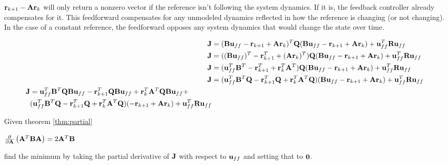 \begin{remark}
  $\mathbf{r}_{k+1} - \mathbf{A}\mathbf{r}_k$ will only return a nonzero vector if the
  reference isn't following the system dynamics. If it is, the feedback
  controller already compensates for it. This feedforward compensates for any
  unmodeled dynamics reflected in how the reference is changing (or not
  changing). In the case of a constant reference, the feedforward opposes any
  system dynamics that would change the state over time.
\end{remark}

\begin{align*}
  \mathbf{J} &= (\mathbf{B}\mathbf{u}_{ff} - \mathbf{r}_{k+1} + \mathbf{A}\mathbf{r}_k)^T \mathbf{Q}
    (\mathbf{B}\mathbf{u}_{ff} - \mathbf{r}_{k+1} + \mathbf{A}\mathbf{r}_k) +
    \mathbf{u}_{ff}^T\mathbf{R}\mathbf{u}_{ff} \\
  \mathbf{J} &= ((\mathbf{B}\mathbf{u}_{ff})^T - \mathbf{r}_{k+1}^T + (\mathbf{A}\mathbf{r}_k)^T)
    \mathbf{Q}(\mathbf{B}\mathbf{u}_{ff} - \mathbf{r}_{k+1} + \mathbf{A}\mathbf{r}_k) +
    \mathbf{u}_{ff}^T\mathbf{R}\mathbf{u}_{ff} \\
  \mathbf{J} &= (\mathbf{u}_{ff}^T\mathbf{B}^T - \mathbf{r}_{k+1}^T + \mathbf{r}_k^T\mathbf{A}^T)
    \mathbf{Q}(\mathbf{B}\mathbf{u}_{ff} - \mathbf{r}_{k+1} + \mathbf{A}\mathbf{r}_k) +
    \mathbf{u}_{ff}^T\mathbf{R}\mathbf{u}_{ff} \\
  \mathbf{J} &= (\mathbf{u}_{ff}^T\mathbf{B}^T\mathbf{Q} - \mathbf{r}_{k+1}^T\mathbf{Q} +
    \mathbf{r}_k^T\mathbf{A}^T\mathbf{Q})(\mathbf{B}\mathbf{u}_{ff} - \mathbf{r}_{k+1} +
    \mathbf{A}\mathbf{r}_k) + \mathbf{u}_{ff}^T\mathbf{R}\mathbf{u}_{ff} \\
  \begin{split}
    \mathbf{J} &= \mathbf{u}_{ff}^T\mathbf{B}^T\mathbf{Q}\mathbf{B}\mathbf{u}_{ff} -
      \mathbf{r}_{k+1}^T\mathbf{Q}\mathbf{B}\mathbf{u}_{ff} +
      \mathbf{r}_k^T\mathbf{A}^T\mathbf{Q}\mathbf{B}\mathbf{u}_{ff} + \\
      &(\mathbf{u}_{ff}^T\mathbf{B}^T\mathbf{Q} -
       \mathbf{r}_{k+1}^T\mathbf{Q} + \mathbf{r}_k^T\mathbf{A}^T\mathbf{Q})
      (-\mathbf{r}_{k+1} + \mathbf{A}\mathbf{r}_k) + \mathbf{u}_{ff}^T\mathbf{R}\mathbf{u}_{ff}
  \end{split}
\end{align*}

Given theorem \ref{thm:partial}

\begin{theorem}
  $\frac{\partial}{\partial\mathbf{A}}\left(\mathbf{A}^T\mathbf{B}\mathbf{A}\right) =
    2\mathbf{A}^T\mathbf{B}$
  \label{thm:partial}
\end{theorem}

find the minimum by taking the partial derivative of $\mathbf{J}$ with respect to
$\mathbf{u}_{ff}$ and setting that to $\mathbf{0}$.

